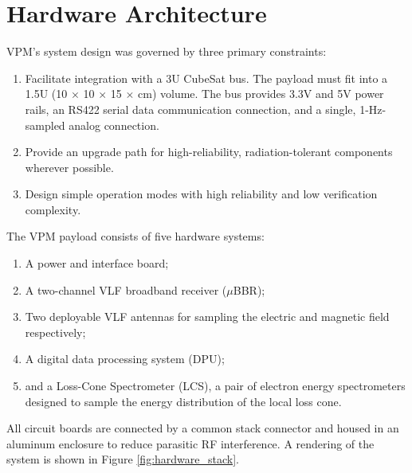 \section{Hardware Architecture}
VPM's system design was governed by three primary constraints:
\begin{enumerate}[noitemsep]
\item Facilitate integration with a 3U CubeSat bus. The payload must fit into a 1.5U (10 $\times$ 10 $\times$ 15 $\times$ cm) volume. The bus provides 3.3V and 5V power rails, an RS422 serial data communication connection, and a single, 1-Hz-sampled analog connection.
\item Provide an upgrade path for high-reliability, radiation-tolerant components wherever possible.
\item Design simple operation modes with high reliability and low verification complexity. 
\end{enumerate}

\noindent The VPM payload consists of five hardware systems:
\begin{enumerate}[noitemsep]
\item A power and interface board;
\item A two-channel VLF broadband receiver ($\mu$BBR);
\item Two deployable VLF antennas for sampling the electric and magnetic field respectively;
\item A digital data processing system (DPU);
\item and a Loss-Cone Spectrometer (LCS), a pair of electron energy spectrometers designed to sample the energy distribution of the local loss cone. 
\end{enumerate}
All circuit boards are connected by a common stack connector and housed in an aluminum enclosure to reduce parasitic RF interference. A rendering of the system is shown in Figure \ref{fig:hardware_stack}.

